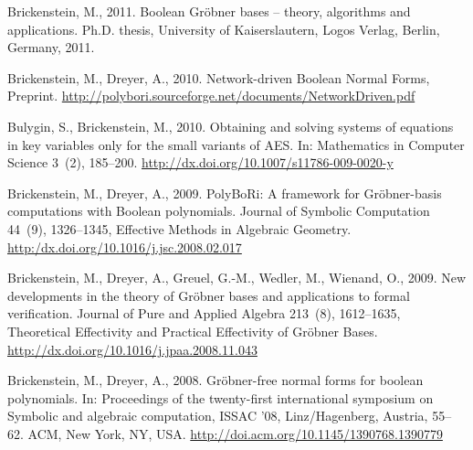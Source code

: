 \begin{thebibliography}{31}

Brickenstein, M., 2011. Boolean {Gr{\"{o}}}bner bases -- theory, algorithms and
  applications. Ph.D. thesis, University of Kaiserslautern, Logos Verlag, Berlin,
  Germany, 2011.

Brickenstein, M., Dreyer, A., 2010. Network-driven Boolean Normal Forms,
Preprint. 
\newline\url{http://polybori.sourceforge.net/documents/NetworkDriven.pdf}

Bulygin, S., Brickenstein, M., 2010. Obtaining and solving systems of equations
  in key variables only for the small variants of {AES}. In: Mathematics in
  Computer Science 3~(2), 185--200.
\newline\url{http://dx.doi.org/10.1007/s11786-009-0020-y}

Brickenstein, M., Dreyer, A., 2009. {PolyBoRi}: A framework for
  {Gröbner}-basis computations with {Boolean} polynomials. Journal of Symbolic
  Computation 44~(9), 1326--1345, {Effective Methods in Algebraic Geometry}.
\newline\url{http:/dx.doi.org/10.1016/j.jsc.2008.02.017}

Brickenstein, M., Dreyer, A., Greuel, G.-M., Wedler, M., Wienand, O.,
  2009. New developments in the theory of {Gröbner} bases and applications to
  formal verification. Journal of Pure and Applied Algebra 213~(8), 1612--1635,
  {Theoretical Effectivity and Practical Effectivity of Gröbner Bases}.
\newline\url{http://dx.doi.org/10.1016/j.jpaa.2008.11.043}

Brickenstein, M., Dreyer, A., 2008.
  Gr\"{o}bner-free normal forms for boolean polynomials.
 In: Proceedings of the twenty-first international symposium on Symbolic and algebraic computation,
 ISSAC '08, Linz/Hagenberg, Austria, 55--62. ACM, New York, NY, USA.
\newline\url{http://doi.acm.org/10.1145/1390768.1390779}

\end{thebibliography}